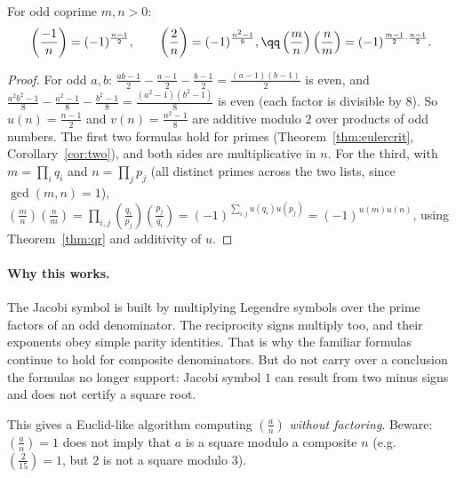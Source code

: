 \begin{proposition}\label{prop:jacobi}
For odd coprime $m,n>0$:
\[
\begin{gathered}\left(\frac{-1}n\right)=(-1)^{\frac{n-1}2},\qquad\left(\frac2n\right)=(-1)^{\frac{n^2-1}8},\qq\left(\frac mn\right)\left(\frac nm\right)=(-1)^{\frac{m-1}2\cdot\frac{n-1}2}.\end{gathered}
\]
\end{proposition}
\begin{proof}
For odd $a,b$: $\frac{ab-1}2-\frac{a-1}2-\frac{b-1}2=\frac{(a-1)(b-1)}2$ is even, and $\frac{a^2b^2-1}8-\frac{a^2-1}8-\frac{b^2-1}8=\frac{(a^2-1)(b^2-1)}8$ is even (each factor is divisible by $8$). So $u(n)=\frac{n-1}2$ and $v(n)=\frac{n^2-1}8$ are additive modulo $2$ over products of odd numbers. The first two formulas hold for primes (Theorem~\ref{thm:eulercrit}, Corollary~\ref{cor:two}), and both sides are multiplicative in $n$. For the third, with $m=\prod_iq_i$ and $n=\prod_jp_j$ (all distinct primes across the two lists, since $\gcd(m,n)=1$),
$\left(\frac mn\right)\left(\frac nm\right)=\prod_{i,j}\left(\frac{q_i}{p_j}\right)\left(\frac{p_j}{q_i}\right)=(-1)^{\sum_{i,j}u(q_i)u(p_j)}=(-1)^{u(m)u(n)}$, using Theorem~\ref{thm:qr} and additivity of $u$.
\end{proof}

\paragraph{Why this works.}
The Jacobi symbol is built by multiplying Legendre symbols over the prime factors of an odd denominator. The reciprocity signs multiply too, and their exponents obey simple parity identities. That is why the familiar formulas continue to hold for composite denominators. But do not carry over a conclusion the formulas no longer support: Jacobi symbol $1$ can result from two minus signs and does not certify a square root.

This gives a Euclid-like algorithm computing $\left(\frac an\right)$ \emph{without factoring}. Beware: $\left(\frac an\right)=1$ does not imply that $a$ is a square modulo a composite $n$ (e.g.\ $\left(\frac2{15}\right)=1$, but $2$ is not a square modulo $3$).

